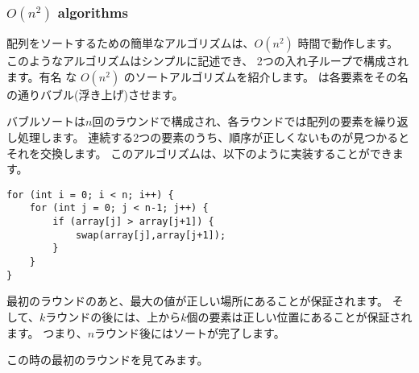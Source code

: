 \subsubsection{$O(n^2)$ algorithms}



配列をソートするための簡単なアルゴリズムは、$O(n^2)$ 時間で動作します。
このようなアルゴリズムはシンプルに記述でき、
2つの入れ子ループで構成されます。有名 な $O(n^2)$ のソートアルゴリズムを紹介します。
 は各要素をその名の通りバブル(浮き上げ)させます。

バブルソートは$n$回のラウンドで構成され、各ラウンドでは配列の要素を繰り返し処理します。
連続する2つの要素のうち、順序が正しくないものが見つかるとそれを交換します。
このアルゴリズムは、以下のように実装することができます。

\begin{lstlisting}
for (int i = 0; i < n; i++) {
    for (int j = 0; j < n-1; j++) {
        if (array[j] > array[j+1]) {
            swap(array[j],array[j+1]);
        }
    }
}
\end{lstlisting}

最初のラウンドのあと、最大の値が正しい場所にあることが保証されます。
そして、$k$ラウンドの後には、上から$k$個の要素は正しい位置にあることが保証されます。
つまり、$n$ラウンド後にはソートが完了します。

\begin{center}
\end{center}

\noindent
この時の最初のラウンドを見てみます。

\begin{center}
\end{center}

